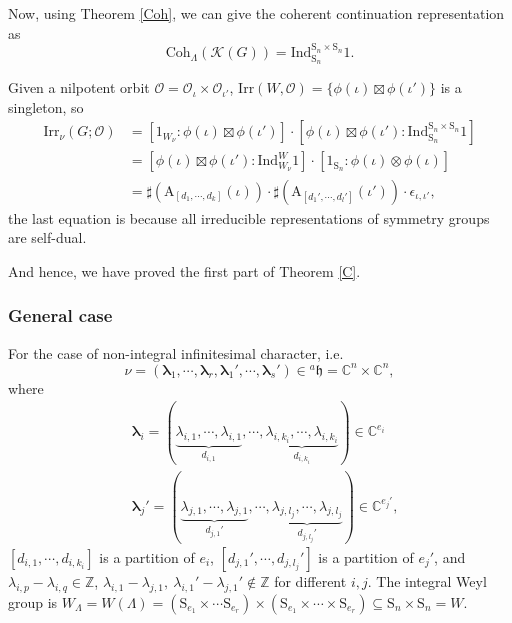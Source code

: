 \documentclass[12pt, a4paper]{amsart}
\numberwithin{equation}{section}
\newcommand{\blam}{{\boldsymbol{\lambda}}}
\newcommand{\BC}{{\mathbb {C}}}
\newcommand{\BZ}{{\mathbb {Z}}}
\newcommand{\CK}{{\mathcal {K}}}
\newcommand{\CO}{{\mathcal {O}}}
\newcommand{\fh}{\mathfrak{h}}
\newcommand{\A}{{\mathrm{A}}}
\newcommand{\Ind}{{\mathrm{Ind}}}
\newcommand{\Irr}{{\mathrm{Irr}}}
\begin{document}
Now, using Theorem \ref{Coh}, we can give the coherent continuation representation as 
\begin{equation}
    \mathrm{Coh}_{\Lambda}(\CK(G)) = \Ind^{\mathrm{S}_n \times \mathrm{S}_n}_{\mathrm{S}_n}1.
\end{equation}

Given a nilpotent orbit $\CO = \CO_{\iota} \times \CO_{\iota'}$, $\Irr(W,\CO) = \{\phi(\iota) \boxtimes \phi(\iota')\}$ is a singleton, so
\begin{align}
    \Irr_{\nu}(G;\CO) & = [1_{W_\nu}:\phi(\iota) \boxtimes \phi(\iota')]\cdot[\phi(\iota)\boxtimes \phi(\iota'):\Ind^{\mathrm{S}_n \times \mathrm{S}_n}_{\mathrm{S}_n}1]\\
    & = [\phi(\iota)\boxtimes \phi(\iota'):\Ind_{W_\nu}^{W}1] \cdot [1_{\mathrm{S}_n}:\phi(\iota) \otimes \phi(\iota)]\\
    & = \sharp(\A_{[d_1,\cdots,d_k]}(\iota)) \cdot \sharp(\A_{[d_1',\cdots,d_l']}(\iota')) \cdot \epsilon_{\iota,\iota'},
\end{align}
the last equation is because all irreducible representations of symmetry groups are self-dual.

And hence, we have proved the first part of Theorem \ref{C}.

\subsubsection{General case}
For the case of non-integral infinitesimal character, i.e. 
$$\nu = (\blam_1, \cdots, \blam_r, \blam_1',\cdots, \blam_s') \in {^{a}\fh} = \BC^n \times \BC^n,$$ 
where 
\begin{align}
    &\blam_i = (\underbrace{\lambda_{i,1}, \cdots,\lambda_{i,1}}_{d_{i,1}},\cdots,\underbrace{\lambda_{i,k_i},\cdots,\lambda_{i,k_i}}_{d_{i,k_i}}) \in \BC^{e_i}\\
    &\blam_j' = (\underbrace{\lambda_{j,1},\cdots,\lambda_{j,1}}_{d_{j,1}'}, \cdots ,\underbrace{\lambda_{j,l_j},\cdots, \lambda_{j,l_j}}_{d_{j,l_j}'}) \in \BC^{e_j'},
\end{align}
 $[d_{i,1} , \cdots , d_{i,k_i}]$ is a partition of $e_i$, $[d_{j,1}', \cdots , d_{j,l_j}']$ is a partition of $e_j'$, and $\lambda_{i,p} - \lambda_{i,q} \in \BZ$, $\lambda_{i,1} - \lambda_{j,1}, \ \lambda_{i,1}' - \lambda_{j,1}' \notin \BZ$ for different $i,j$. The integral Weyl group is $W_\Lambda = W(\Lambda) = (\mathrm{S}_{e_1} \times \cdots \mathrm{S}_{e_r}) \times (\mathrm{S}_{e_1} \times \cdots \times \mathrm{S}_{e_r}) \subseteq \mathrm{S}_n \times \mathrm{S}_n = W$.
\end{document}
